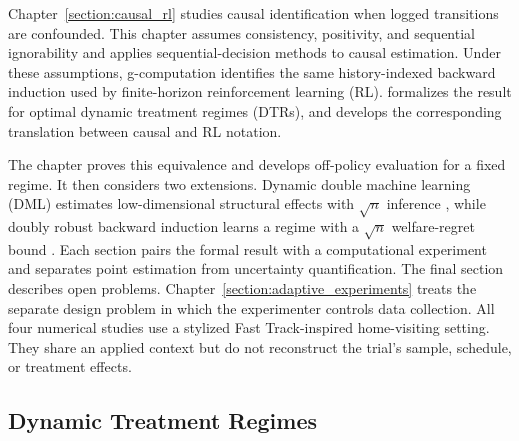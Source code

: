 

Chapter~\ref{section:causal_rl} studies causal identification when logged transitions are confounded. This chapter assumes consistency, positivity, and sequential ignorability and applies sequential-decision methods to causal estimation. Under these assumptions, g-computation identifies the same history-indexed backward induction used by finite-horizon reinforcement learning (RL). \citet{murphy2003dtr} formalizes the result for optimal dynamic treatment regimes (DTRs), and \citet{schulte2014qlearning} develops the corresponding translation between causal and RL notation.

The chapter proves this equivalence and develops off-policy evaluation for a fixed regime. It then considers two extensions. Dynamic double machine learning (DML) estimates low-dimensional structural effects with $\sqrt n$ inference \citep{lewisSyrgkanis2021dynamicDML}, while doubly robust backward induction learns a regime with a $\sqrt n$ welfare-regret bound \citep{sakaguchi2024dynamicpolicy}. Each section pairs the formal result with a computational experiment and separates point estimation from uncertainty quantification. The final section describes open problems. Chapter~\ref{section:adaptive_experiments} treats the separate design problem in which the experimenter controls data collection. All four numerical studies use a stylized Fast Track-inspired home-visiting setting. They share an applied context but do not reconstruct the trial's sample, schedule, or treatment effects.

\subsection{Dynamic Treatment Regimes}
\label{subsec:gmethods_bridge}

